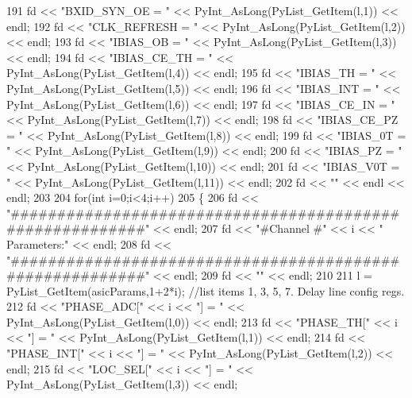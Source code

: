 \begin{DoxyCode}
{{191         fd <<   \textcolor{stringliteral}{"BXID\_SYN\_OE = "} << PyInt\_AsLong(PyList\_GetItem(l,1)) << endl;
192         fd <<   \textcolor{stringliteral}{"CLK\_REFRESH = "} << PyInt\_AsLong(PyList\_GetItem(l,2)) << endl;
193         fd <<   \textcolor{stringliteral}{"IBIAS\_OB    = "} << PyInt\_AsLong(PyList\_GetItem(l,3)) << endl;
194         fd <<   \textcolor{stringliteral}{"IBIAS\_CE\_TH = "} << PyInt\_AsLong(PyList\_GetItem(l,4)) << endl;
195         fd <<   \textcolor{stringliteral}{"IBIAS\_TH    = "} << PyInt\_AsLong(PyList\_GetItem(l,5)) << endl;
196         fd <<   \textcolor{stringliteral}{"IBIAS\_INT   = "} << PyInt\_AsLong(PyList\_GetItem(l,6)) << endl;
197         fd <<   \textcolor{stringliteral}{"IBIAS\_CE\_IN = "} << PyInt\_AsLong(PyList\_GetItem(l,7)) << endl;
198         fd <<   \textcolor{stringliteral}{"IBIAS\_CE\_PZ = "} << PyInt\_AsLong(PyList\_GetItem(l,8)) << endl;  
199         fd <<   \textcolor{stringliteral}{"IBIAS\_0T    = "} << PyInt\_AsLong(PyList\_GetItem(l,9)) << endl;
200         fd <<   \textcolor{stringliteral}{"IBIAS\_PZ    = "} << PyInt\_AsLong(PyList\_GetItem(l,10)) << endl;
201         fd <<   \textcolor{stringliteral}{"IBIAS\_V0T   = "} << PyInt\_AsLong(PyList\_GetItem(l,11)) << endl;
202         fd << \textcolor{stringliteral}{""} << endl << endl;
203 
204         \textcolor{keywordflow}{for}(\textcolor{keywordtype}{int} i=0;i<4;i++)
205         \{
206             fd << \textcolor{stringliteral}{"#########################################################"} << endl;
207             fd << \textcolor{stringliteral}{"#Channel #"} << i << \textcolor{stringliteral}{" Parameters:"} << endl;
208             fd << \textcolor{stringliteral}{"#########################################################"} << endl;
209             fd << \textcolor{stringliteral}{""} << endl;
210 
211             l = PyList\_GetItem(asicParams,1+2*i);       \textcolor{comment}{//list items 1, 3, 5, 7. Delay line config regs.}
212             fd <<   \textcolor{stringliteral}{"PHASE\_ADC["} << i << \textcolor{stringliteral}{"]   = "} << PyInt\_AsLong(PyList\_GetItem(l,0)) << endl;
213             fd <<   \textcolor{stringliteral}{"PHASE\_TH["} << i << \textcolor{stringliteral}{"]    = "} << PyInt\_AsLong(PyList\_GetItem(l,1)) << endl;
214             fd <<   \textcolor{stringliteral}{"PHASE\_INT["} << i << \textcolor{stringliteral}{"]   = "} << PyInt\_AsLong(PyList\_GetItem(l,2)) << endl;
215             fd <<   \textcolor{stringliteral}{"LOC\_SEL["} << i << \textcolor{stringliteral}{"]     = "} << PyInt\_AsLong(PyList\_GetItem(l,3)) << endl;
}}
\end{DoxyCode}
